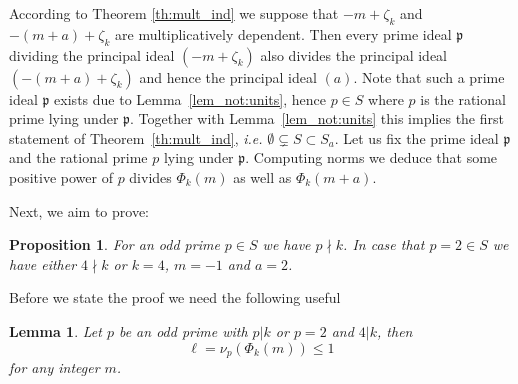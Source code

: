 \documentclass{amsart}
\theoremstyle{plain}
\numberwithin{equation}{section}
\newtheorem{lemma}[thm]{Lemma}
\newtheorem{proposition}[thm]{Proposition}
\theoremstyle{remark}
\begin{document}
According to Theorem \ref{th:mult_ind} we suppose that
$-m+\zeta_k$ and $-(m+a)+\zeta_k$ are multiplicatively dependent. Then
every prime ideal ${{\mathfrak p}}$ dividing the principal ideal $(-m+\zeta_k)$
also divides the principal ideal $(-(m+a)+\zeta_k)$ and hence the principal ideal
$(a)$. Note that such a prime ideal ${{\mathfrak p}}$ exists due to
Lemma~\ref{lem_not:units}, hence $p\in S$ where $p$ is the rational prime lying under ${{\mathfrak p}}$. Together with Lemma~\ref{lem_not:units}
this implies the first statement of Theorem~\ref{th:mult_ind},
\textit{i.e.} $\emptyset\subsetneq S\subset S_a$. Let us fix the prime ideal
${{\mathfrak p}}$ and the rational prime $p$ lying under ${{\mathfrak p}}$. Computing
norms we deduce that some positive power of $p$ divides $\Phi_k(m)$ as
well as $\Phi_k(m+a)$.

Next, we aim to prove:

\begin{proposition}\label{prop:not_divisible}
 For an odd prime $p\in S$ we have $p \nmid k$. In case that $p=2 \in S$ we have either $4\nmid k$ or $k=4$, $m=-1$ and $a=2$.
\end{proposition}

Before we state the proof we need the following useful
\begin{lemma}\label{lem:cyc_pol_div}
 Let $p$ be an odd prime with $p|k$ or $p=2$ and $4|k$, then
 $$\ell=\nu_p(\Phi_k(m))\leq 1$$
 for any integer $m$.
\end{lemma}
\end{document}
